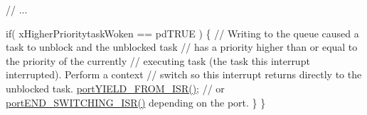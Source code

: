 \begin{DoxyPre}    // ...\end{DoxyPre}



\begin{DoxyPre}    if( xHigherPrioritytaskWoken == pdTRUE )
    \{
        // Writing to the queue caused a task to unblock and the unblocked task
        // has a priority higher than or equal to the priority of the currently
        // executing task (the task this interrupt interrupted).  Perform a context
        // switch so this interrupt returns directly to the unblocked task.
        \mbox{\hyperlink{portmacro_8h_aac6850c66595efdc02a8bbb95fb4648e}{portYIELD\_FROM\_ISR()}}; // or \mbox{\hyperlink{portmacro_8h_a63b994040c62c9685490a71c87a13d8a}{portEND\_SWITCHING\_ISR()}} depending on the port.
    \}
\}
 \end{DoxyPre}
 
